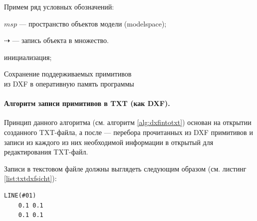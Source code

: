 Примем ряд условных обозначений:

$msp$ --- пространство объектов модели (modelspace);

$\dashrightarrow$ --- запись объекта в множество.


\begin{algorithm}[H]
	\SetAlgoLined
	инициализация;
	
	
	
	\caption[Сохранение поддерживаемых примитивов; из DXF в оперативную память программы]
	{Сохранение поддерживаемых примитивов \\ из DXF в оперативную память программы\endtabular}
	\label{alg:readdxf}
\end{algorithm}

\paragraph{Алгоритм записи примитивов в TXT (как DXF).} Принцип данного алгоритма (см. алгоритм \ref{alg:dxfintotxt}) основан на открытии созданного TXT-файла, а после --- перебора прочитанных из DXF примитивов и записи из каждого из них необходимой информации в открытый для редактирования TXT-файл.

Записи в текстовом файле должны выглядеть следующим образом (см. листинг \ref{list:txtdxfsicht}):

\begin{lstlisting}[caption={Пример содержания TXT-файла (как DXF)},label=list:txtdxfsicht]
	LINE(#01)
	0.1 0.1
	0.1 0.1
\end{lstlisting}

